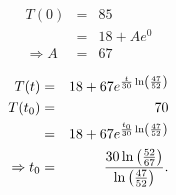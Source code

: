 \begin{frame}

  \begin{eqnarray*}
    T(0) & = & 85 \\
    & = & 18 + A e^{0} \\
    \Rightarrow A & = & 67
  \end{eqnarray*}

  \begin{eqnarray*}
    T(t)  & = & 18 + 67 e^{\frac{t}{30} \ln\left(\frac{47}{52}\right)} \\
    T(t_0)& = & 70 \\
    & = & 18 + 67 e^{\frac{t_0}{30} \ln\left(\frac{47}{52}\right)} \\
    \Rightarrow t_0 & = & \frac{30\ln\left(\frac{52}{67}\right)}{\ln\left(\frac{47}{52}\right)}.
  \end{eqnarray*}

\end{frame}



